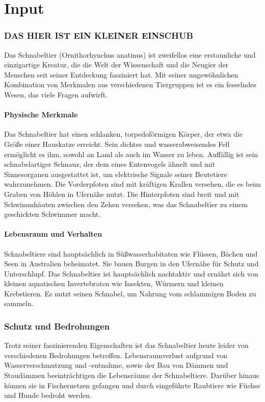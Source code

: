 \part{Input}

\section{DAS HIER IST EIN KLEINER EINSCHUB}
    Das Schnabeltier (Ornithorhynchus anatinus) ist zweifellos eine erstaunliche und einzigartige Kreatur, die die Welt der Wissenschaft und die Neugier der Menschen seit seiner Entdeckung fasziniert hat. Mit seiner ungewöhnlichen Kombination von Merkmalen aus verschiedenen Tiergruppen ist es ein fesselndes Wesen, das viele Fragen aufwirft.

    \subsection{Physische Merkmale}
        Das Schnabeltier hat einen schlanken, torpedoförmigen Körper, der etwa die Größe einer Hauskatze erreicht. Sein dichtes und wasserabweisendes Fell ermöglicht es ihm, sowohl an Land als auch im Wasser zu leben. Auffällig ist sein schnabelartiger Schnauz, der dem eines Entenvogels ähnelt und mit Sinnesorganen ausgestattet ist, um elektrische Signale seiner Beutetiere wahrzunehmen. Die Vorderpfoten sind mit kräftigen Krallen versehen, die es beim Graben von Höhlen in Ufernähe nutzt. Die Hinterpfoten sind breit und mit Schwimmhäuten zwischen den Zehen versehen, was das Schnabeltier zu einem geschickten Schwimmer macht.

    \subsection{Lebensraum und Verhalten}
        Schnabeltiere sind hauptsächlich in Süßwasserhabitaten wie Flüssen, Bächen und Seen in Australien beheimatet. Sie bauen Burgen in den Ufernähe für Schutz und Unterschlupf. Das Schnabeltier ist hauptsächlich nachtaktiv und ernährt sich von kleinen aquatischen Invertebraten wie Insekten, Würmern und kleinen Krebstieren. Es nutzt seinen Schnabel, um Nahrung vom schlammigen Boden zu sammeln.

\section{Schutz und Bedrohungen}
    Trotz seiner faszinierenden Eigenschaften ist das Schnabeltier heute leider von verschiedenen Bedrohungen betroffen. Lebensraumverlust aufgrund von Wasserverschmutzung und -entnahme, sowie der Bau von Dämmen und Staudämmen beeinträchtigen die Lebensräume der Schnabeltiere. Darüber hinaus können sie in Fischernetzen gefangen und durch eingeführte Raubtiere wie Füchse und Hunde bedroht werden.

